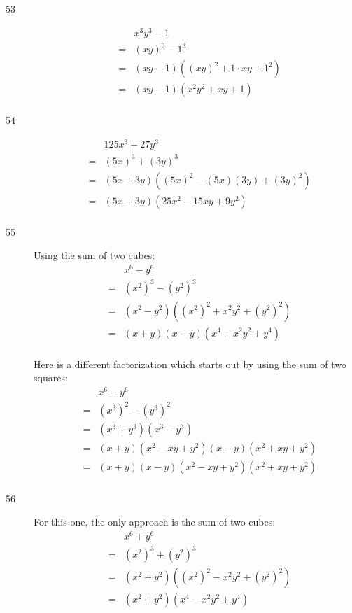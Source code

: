 \documentclass[fleqn,addpoints]{exam}
\begin{document}
\begin{description}
\item[53]
\begin{eqnarray*}
  &&  x^3y^3 - 1 \\
  &=& (xy)^3 - 1^3 \\
  &=& (xy - 1)((xy)^2 + 1 \cdot xy + 1^2) \\ 
  &=& (xy - 1)(x^2y^2 + xy + 1) \\ 
\end{eqnarray*}

\item[54]
\begin{eqnarray*}
  &&  125x^3 + 27y^3 \\
  &=& (5x)^3 + (3y)^3 \\
  &=& (5x + 3y)((5x)^2 - (5x)(3y) + (3y)^2) \\ 
  &=& (5x + 3y)(25x^2 - 15xy + 9y^2) \\ 
\end{eqnarray*}

\item[55]
Using the sum of two cubes:
\begin{eqnarray*}
  &&  x^6 - y^6 \\
  &=& (x^2)^3 - (y^2)^3 \\
  &=& (x^2 - y^2)((x^2)^2 + x^2y^2 + (y^2)^2) \\ 
  &=& (x + y)(x - y)(x^4 + x^2y^2 + y^4) \\ 
\end{eqnarray*}

Here is a different factorization which starts out by using the sum of two squares:
\begin{eqnarray*}
  &&  x^6 - y^6 \\
  &=& (x^3)^2 - (y^3)^2 \\
  &=& (x^3 + y^3)(x^3 - y^3)\\ 
  &=& (x + y)(x^2 - xy + y^2)(x - y)(x^2 + xy + y^2) \\ 
  &=& (x + y)(x - y)(x^2 - xy + y^2)(x^2 + xy + y^2) \\ 
\end{eqnarray*}

\item[56]
For this one, the only approach is the sum of two cubes:
\begin{eqnarray*}
  &&  x^6 + y^6 \\
  &=& (x^2)^3 + (y^2)^3 \\
  &=& (x^2 + y^2)((x^2)^2 - x^2y^2 + (y^2)^2) \\ 
  &=& (x^2 + y^2)(x^4 - x^2y^2 + y^4) \\ 
\end{eqnarray*}


\end{description}
\end{document}
